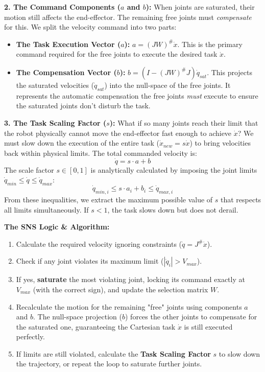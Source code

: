 \documentclass[11pt,a4paper]{article}
\begin{document}
\textbf{2. The Command Components ($a$ and $b$):} 
When joints are saturated, their motion still affects the end-effector. The remaining free joints must \textit{compensate} for this. We split the velocity command into two parts:
\begin{itemize}
    \item \textbf{The Task Execution Vector ($a$):} $a = (JW)^\# \dot{x}$. This is the primary command required for the free joints to execute the desired task $\dot{x}$.
    \item \textbf{The Compensation Vector ($b$):} $b = (I - (JW)^\# J)\dot{q}_{sat}$. This projects the saturated velocities ($\dot{q}_{sat}$) into the null-space of the free joints. It represents the automatic compensation the free joints \textit{must} execute to ensure the saturated joints don't disturb the task.
\end{itemize}

\textbf{3. The Task Scaling Factor ($s$):}
What if so many joints reach their limit that the robot physically cannot move the end-effector fast enough to achieve $\dot{x}$? We must slow down the execution of the entire task ($\dot{x}_{new} = s\dot{x}$) to bring velocities back within physical limits. The total commanded velocity is:
\begin{equation}
    \dot{q} = s \cdot a + b
\end{equation}
The scale factor $s \in [0,1]$ is analytically calculated by imposing the joint limits $\dot{q}_{min} \le \dot{q} \le \dot{q}_{max}$:
\begin{equation}
    \dot{q}_{min, i} \le s \cdot a_i + b_i \le \dot{q}_{max, i}
\end{equation}
From these inequalities, we extract the maximum possible value of $s$ that respects all limits simultaneously. If $s < 1$, the task slows down but does not derail.
 

\textbf{The SNS Logic \& Algorithm:} 
\begin{enumerate}
    \item Calculate the required velocity ignoring constraints ($\dot{q} = J^\# \dot{x}$).
    \item Check if any joint violates its maximum limit ($|\dot{q}_i| > V_{max}$).
    \item If yes, \textbf{saturate} the most violating joint, locking its command exactly at $V_{max}$ (with the correct sign), and update the selection matrix $W$.
    \item Recalculate the motion for the remaining "free" joints using components $a$ and $b$. The null-space projection ($b$) forces the other joints to compensate for the saturated one, guaranteeing the Cartesian task $\dot{x}$ is still executed perfectly.
    \item If limits are still violated, calculate the \textbf{Task Scaling Factor} $s$ to slow down the trajectory, or repeat the loop to saturate further joints.
\end{enumerate}
\end{document}
